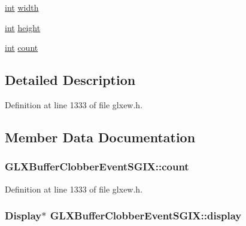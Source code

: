 \begin{DoxyCompactItemize}
\item 
\hyperlink{wglew_8h_a500a82aecba06f4550f6849b8099ca21}{int} \hyperlink{struct_g_l_x_buffer_clobber_event_s_g_i_x_adad23535733161528427584a42bfc6eb}{width}
\item 
\hyperlink{wglew_8h_a500a82aecba06f4550f6849b8099ca21}{int} \hyperlink{struct_g_l_x_buffer_clobber_event_s_g_i_x_a7838dbabb76c22aa8241310a3f2363ea}{height}
\item 
\hyperlink{wglew_8h_a500a82aecba06f4550f6849b8099ca21}{int} \hyperlink{struct_g_l_x_buffer_clobber_event_s_g_i_x_ad8f4f0aae058e0a1ff542679823e37a9}{count}
\end{DoxyCompactItemize}


\subsection{Detailed Description}


Definition at line 1333 of file glxew.\+h.



\subsection{Member Data Documentation}
\hypertarget{struct_g_l_x_buffer_clobber_event_s_g_i_x_ad8f4f0aae058e0a1ff542679823e37a9}{}
\subsubsection[{count}]{ G\+L\+X\+Buffer\+Clobber\+Event\+S\+G\+I\+X\+::count}\label{struct_g_l_x_buffer_clobber_event_s_g_i_x_ad8f4f0aae058e0a1ff542679823e37a9}


Definition at line 1333 of file glxew.\+h.

\hypertarget{struct_g_l_x_buffer_clobber_event_s_g_i_x_afef060d81026da75c846727f4a3de9d4}{}
\subsubsection[{display}]{\setlength{\rightskip}{0pt plus 5cm}Display$\ast$ G\+L\+X\+Buffer\+Clobber\+Event\+S\+G\+I\+X\+::display}\label{struct_g_l_x_buffer_clobber_event_s_g_i_x_afef060d81026da75c846727f4a3de9d4}


